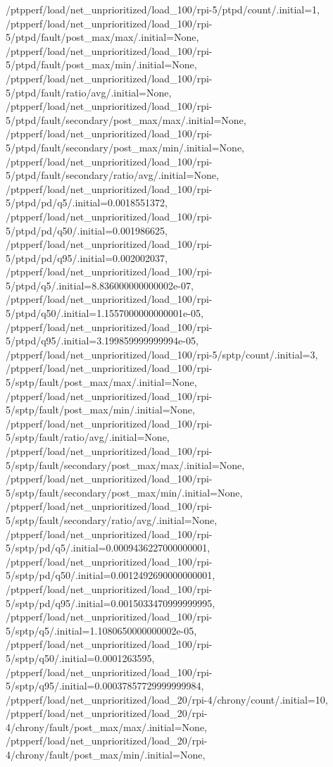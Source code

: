 {    /ptpperf/load/net_unprioritized/load_100/rpi-5/ptpd/count/.initial=1,
    /ptpperf/load/net_unprioritized/load_100/rpi-5/ptpd/fault/post_max/max/.initial=None,
    /ptpperf/load/net_unprioritized/load_100/rpi-5/ptpd/fault/post_max/min/.initial=None,
    /ptpperf/load/net_unprioritized/load_100/rpi-5/ptpd/fault/ratio/avg/.initial=None,
    /ptpperf/load/net_unprioritized/load_100/rpi-5/ptpd/fault/secondary/post_max/max/.initial=None,
    /ptpperf/load/net_unprioritized/load_100/rpi-5/ptpd/fault/secondary/post_max/min/.initial=None,
    /ptpperf/load/net_unprioritized/load_100/rpi-5/ptpd/fault/secondary/ratio/avg/.initial=None,
    /ptpperf/load/net_unprioritized/load_100/rpi-5/ptpd/pd/q5/.initial=0.0018551372,
    /ptpperf/load/net_unprioritized/load_100/rpi-5/ptpd/pd/q50/.initial=0.001986625,
    /ptpperf/load/net_unprioritized/load_100/rpi-5/ptpd/pd/q95/.initial=0.002002037,
    /ptpperf/load/net_unprioritized/load_100/rpi-5/ptpd/q5/.initial=8.836000000000002e-07,
    /ptpperf/load/net_unprioritized/load_100/rpi-5/ptpd/q50/.initial=1.1557000000000001e-05,
    /ptpperf/load/net_unprioritized/load_100/rpi-5/ptpd/q95/.initial=3.199859999999994e-05,
    /ptpperf/load/net_unprioritized/load_100/rpi-5/sptp/count/.initial=3,
    /ptpperf/load/net_unprioritized/load_100/rpi-5/sptp/fault/post_max/max/.initial=None,
    /ptpperf/load/net_unprioritized/load_100/rpi-5/sptp/fault/post_max/min/.initial=None,
    /ptpperf/load/net_unprioritized/load_100/rpi-5/sptp/fault/ratio/avg/.initial=None,
    /ptpperf/load/net_unprioritized/load_100/rpi-5/sptp/fault/secondary/post_max/max/.initial=None,
    /ptpperf/load/net_unprioritized/load_100/rpi-5/sptp/fault/secondary/post_max/min/.initial=None,
    /ptpperf/load/net_unprioritized/load_100/rpi-5/sptp/fault/secondary/ratio/avg/.initial=None,
    /ptpperf/load/net_unprioritized/load_100/rpi-5/sptp/pd/q5/.initial=0.0009436227000000001,
    /ptpperf/load/net_unprioritized/load_100/rpi-5/sptp/pd/q50/.initial=0.0012492690000000001,
    /ptpperf/load/net_unprioritized/load_100/rpi-5/sptp/pd/q95/.initial=0.0015033470999999995,
    /ptpperf/load/net_unprioritized/load_100/rpi-5/sptp/q5/.initial=1.1080650000000002e-05,
    /ptpperf/load/net_unprioritized/load_100/rpi-5/sptp/q50/.initial=0.0001263595,
    /ptpperf/load/net_unprioritized/load_100/rpi-5/sptp/q95/.initial=0.00037857729999999984,
    /ptpperf/load/net_unprioritized/load_20/rpi-4/chrony/count/.initial=10,
    /ptpperf/load/net_unprioritized/load_20/rpi-4/chrony/fault/post_max/max/.initial=None,
    /ptpperf/load/net_unprioritized/load_20/rpi-4/chrony/fault/post_max/min/.initial=None,
}
